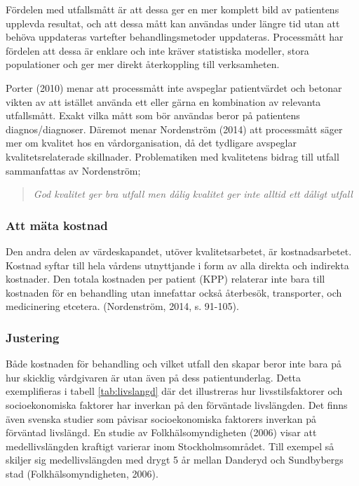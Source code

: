 Fördelen med utfallsmått är att dessa ger en mer komplett bild av patientens upplevda resultat, och att dessa mått kan användas under längre tid utan att behöva uppdateras vartefter behandlingsmetoder  uppdateras. Processmått har fördelen att dessa är enklare och inte kräver statistiska modeller, stora populationer och ger mer direkt återkoppling till verksamheten. 
 
Porter (2010) menar att processmått inte avspeglar patientvärdet och betonar vikten av att istället använda ett eller gärna en kombination av relevanta utfallsmått. Exakt vilka mått som bör användas beror på patientens diagnos/diagnoser. Däremot menar Nordenström (2014) att processmått säger mer om kvalitet hos en vårdorganisation, då det tydligare avspeglar kvalitetsrelaterade skillnader. Problematiken med kvalitetens bidrag till utfall sammanfattas av Nordenström;
\begin{quotation}
\textit{God kvalitet ger bra utfall men dålig kvalitet ger inte alltid ett dåligt utfall}
\end{quotation}

\subsubsection{Att mäta kostnad}

Den andra delen av värdeskapandet, utöver kvalitetsarbetet, är kostnadsarbetet.
Kostnad syftar till hela vårdens utnyttjande i form av alla direkta och
indirekta kostnader. Den totala kostnaden per patient (KPP) relaterar inte bara
till kostnaden för en behandling utan innefattar också återbesök, transporter,
och medicinering etcetera. (Nordenström, 2014, s. 91-105).

\subsubsection{Justering}

Både kostnaden för behandling och vilket utfall den skapar beror inte bara på hur skicklig vårdgivaren är utan även på dess patientunderlag. Detta exemplifieras i tabell \ref{tab:livslangd} där det illustreras hur livsstilsfaktorer och socioekonomiska faktorer har inverkan på den förväntade livslängden. Det finns även svenska studier som påvisar socioekonomiska faktorers inverkan på förväntad livslängd. En studie av
Folkhälsomyndigheten (2006) visar att medellivslängden kraftigt varierar inom Stockholmsområdet. Till exempel så skiljer sig medellivslängden med drygt 5 år mellan Danderyd och Sundbybergs stad (Folkhälsomyndigheten, 2006).

